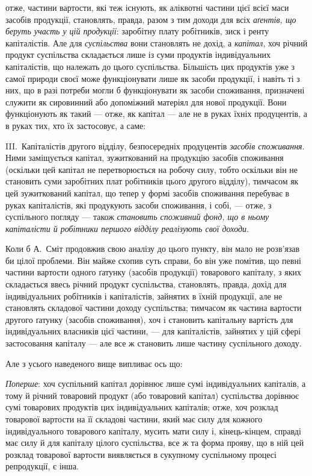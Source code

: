 \parcont{}  %
отже, частини вартости, які теж існують, як аліквотні частини цієї всієї
маси засобів продукції, становлять, правда, разом з тим доходи для
всіх \emph{аґентів, що беруть участь у цій продукції}: заробітну
плату робітників, зиск і ренту капіталістів. Але для \emph{суспільства}
вони становлять не дохід, а \emph{капітал}, хоч річний продукт суспільства
складається лише із суми продуктів індивідуальних капіталістів, що належать
до цього суспільства. Більшість цих продуктів уже з самої природи
своєї може функціонувати лише як засоби продукції, і навіть ті з них,
що в разі потреби могли б функціонувати як засоби споживання, призначені
служити як сировинний або допоміжний матеріял для нової продукції.
Вони функціонують як такий — отже, як капітал — але не в руках
їхніх продуцентів, а в руках тих, хто їх застосовує, а саме:

III.~Капіталістів другого відділу, безпосередніх продуцентів \emph{засобів
споживання}. Ними заміщується капітал, зужиткований на продукцію
засобів споживання (оскільки цей капітал не перетворюється на робочу
силу, тобто оскільки він не становить суми заробітних плат робітників
цього другого відділу), тимчасом як цей зужиткований капітал, що тепер
у формі засобів споживання перебуває в руках капіталістів, які продукують
засоби споживання, і собі, — отже, з суспільного погляду — також
\emph{становить споживний фонд, що в ньому капіталісти
й робітники першого відділу реалізують свої доходи}.

Коли б А.~Сміт продовжив свою аналізу до цього пункту, він мало
не роз\-в’я\-зав би цілої проблеми. Він майже схопив суть справи, бо він
уже помітив, що певні частини вартости одного ґатунку (засобів продукції)
товарового капіталу, з яких складається ввесь річний продукт
суспільства, становлять, правда, дохід для індивідуальних робітників і капіталістів,
зайнятих в їхній продукції, але не становлять складової частини
доходу суспільства; тимчасом як частина вартости другого ґатунку
(засобів споживання), хоч і становить капітальну вартість для індивідуальних
власників цієї частини, — для капіталістів, зайнятих у цій сфері
застосовання капіталу — але все ж становить лише частину суспільного
доходу.

Але з усього наведеного вище випливає ось що:

\emph{Поперше}: хоч суспільний капітал дорівнює лише сумі індивідуальних
капіталів, а тому й річний товаровий продукт (або товаровий капітал)
суспільства дорівнює сумі товарових продуктів цих індивідуальних капіталів;
отже, хоч розклад товарової вартости на її складові частини, який має
силу для кожного індивідуального товарового капіталу, мусить мати силу
і, кінець-кінцем, справді має силу й для капіталу цілого суспільства, все ж
та форма прояву, що в ній цей розклад товарової вартости виявляється
в сукупному суспільному процесі репродукції, є інша.

